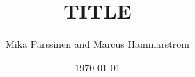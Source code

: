 \documentclass[a4paper]{article}
\title{TITLE}
\author{Mika Pärssinen and Marcus Hammarström}
\date{\today}
\begin{document}
\maketitle










\renewcommand{\refname}{References}


\end{document}
